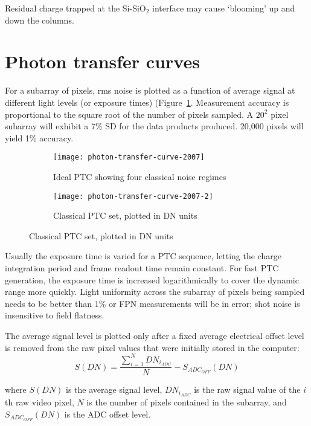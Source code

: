 \documentclass[10pt,fleqn]{article}
\begin{document}
{Residual charge trapped at the Si-SiO$_2$ interface may cause `blooming' up and down the columns.

\section{Photon transfer curves \cite{janesick2007}}

For a subarray of pixels, rms noise is plotted as a function of average signal at different light levels (or exposure times) (Figure~\ref{fig:photon-transfer-curve-2007}. Measurement accuracy is proportional to the square root of the number of pixels sampled. A $20^2$ pixel subarray will exhibit a 7\% SD for the data products produced. 20,000 pixels will yield 1\% accuracy.

\begin{figure}[!ht]
\caption{Example of a photon-transfer curve with $\eta_E = 1$.}
\centering
%
\begin{subfigure}[t]{0.49\textwidth}
\caption{Ideal PTC showing four classical noise regimes}
\label{fig:photon-transfer-curve-2007}
\texttt{[image: photon-transfer-curve-2007]} 
\end{subfigure}
%
\begin{subfigure}[t]{0.49\textwidth}
\caption{Classical PTC set, plotted in DN units}
\label{fig:photon-transfer-curve-2007-2}
\texttt{[image: photon-transfer-curve-2007-2]} 
\end{subfigure}
%
\end{figure}

Usually the exposure time is varied for a PTC sequence, letting the charge integration period and frame readout time remain constant. For fast PTC generation, the exposure time is increased logarithmically to cover the dynamic range more quickly. Light uniformity across the subarray of pixels being sampled needs to be better than 1\% or FPN measurements will be in error; shot noise is insensitive to field flatness.

The average signal level is plotted only after a fixed average electrical offset level is removed from the raw pixel values that were initially stored in the computer:
\[ S(DN) = \frac{\sum_{i=1}^{N} DN_{i_{ADC}}}{N} - S_{ADC_{OFF}}(DN) \]

where $S(DN)$ is the average signal level, $DN_{i_{ADC}}$ is the raw signal value of the $i$th raw video pixel, $N$ is the number of pixels contained in the subarray, and $S_{ADC_{OFF}} (DN)$ is the ADC offset level.

}
\end{document}
